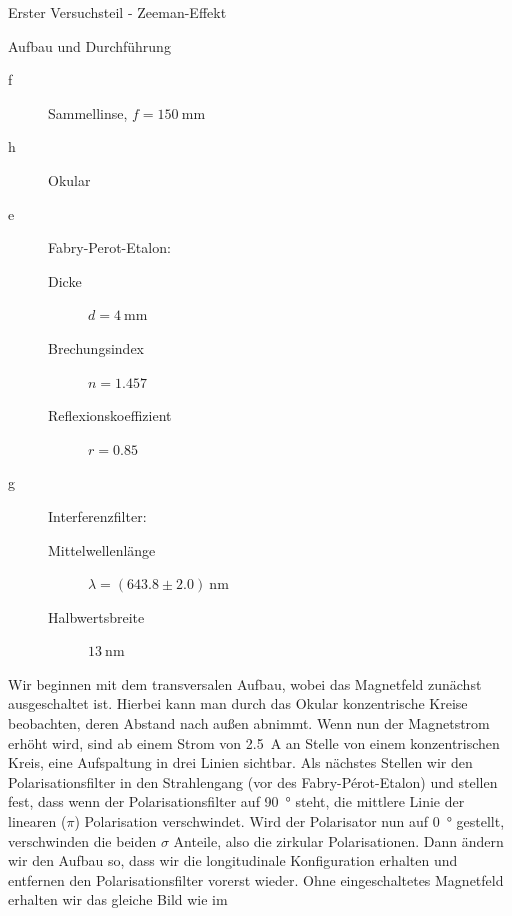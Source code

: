 \documentclass[pdftex, a4paper,11pt, twoside, ngerman]{report}
\begin{document}
\begin{chapter}{Erster Versuchsteil - Zeeman-Effekt}
\begin{section}{Aufbau und Durchführung}
\begin{minipage}{0.4\textwidth}
\begin{description}
          \item[f] Sammellinse, $f=\SI{150}{\milli\meter}$
          \item[h] Okular
        \end{description}
      \end{minipage}\quad
      \begin{minipage}{0.56\textwidth}
        \begin{description}
          \item[e] Fabry-Perot-Etalon: 
              \begin{description}
                \item[Dicke] $d=\SI{4}{\milli\meter}$
                \item[Brechungsindex] $n=1.457$
                \item[Reflexionskoeffizient] $r=0.85$
              \end{description}
          \item[g] Interferenzfilter:
              \begin{description}
                \item[Mittelwellenlänge] $\lambda=(643.8\pm2.0)
                    \SI{}{\nano\meter}$
                \item[Halbwertsbreite] $\SI{13}{\nano\meter}$
              \end{description}
        \end{description}
      \end{minipage}
      \newpage
      Wir beginnen mit dem transversalen Aufbau, wobei das Magnetfeld zunächst
      ausgeschaltet ist. Hierbei kann man durch das Okular konzentrische Kreise
      beobachten, deren Abstand nach außen abnimmt. Wenn nun der Magnetstrom
      erhöht wird, sind ab einem Strom von \SI{2,5}{\ampere} an Stelle von
      einem konzentrischen Kreis, eine Aufspaltung in drei Linien sichtbar. Als
      nächstes Stellen wir den Polarisationsfilter in den Strahlengang (vor des
      Fabry-Pérot-Etalon) und stellen fest, dass wenn der Polarisationsfilter
      auf \SI{90}{\degree} steht, die mittlere Linie der linearen ($\pi$)
      Polarisation verschwindet. Wird der Polarisator nun auf
      \SI{0}{\degree} gestellt, verschwinden die beiden $\sigma$ Anteile, also
      die zirkular Polarisationen. \newline
      Dann ändern wir den Aufbau so, dass wir die longitudinale Konfiguration
      erhalten und entfernen den Polarisationsfilter vorerst wieder. Ohne
      eingeschaltetes Magnetfeld erhalten wir das gleiche Bild wie im

\end{section}
\end{chapter}
\end{document}

